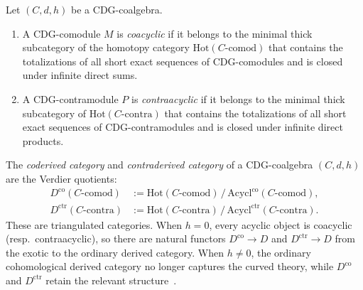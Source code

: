 \begin{definition}
\label{def:coacyclic-contraacyclic}
Let $(C, d, h)$ be a CDG-coalgebra.
\begin{enumerate}[label=\textup{(\roman*)}]
\item A CDG-comodule $M$ is \emph{coacyclic} if it belongs to the
  minimal thick subcategory of the homotopy category
  $\mathrm{Hot}(C\text{-}\mathrm{comod})$ that contains the
  totalizations of all short exact sequences of CDG-comodules
  and is closed under infinite direct sums.
\item A CDG-contramodule $P$ is \emph{contraacyclic} if it belongs
  to the minimal thick subcategory of
  $\mathrm{Hot}(C\text{-}\mathrm{contra})$ that contains the
  totalizations of all short exact sequences of CDG-contramodules
  and is closed under infinite direct products.
\end{enumerate}
\end{definition}

\begin{definition}
\label{def:coderived-contraderived-abstract}
The \emph{coderived category} and \emph{contraderived category}
of a CDG-coalgebra $(C, d, h)$ are the Verdier quotients:
\begin{align}
D^{\mathrm{co}}(C\text{-}\mathrm{comod})
  &:= \mathrm{Hot}(C\text{-}\mathrm{comod})
  \,\big/\, \mathrm{Acycl}^{\mathrm{co}}(C\text{-}\mathrm{comod}),
  \label{eq:coderived-abstract}\\
D^{\mathrm{ctr}}(C\text{-}\mathrm{contra})
  &:= \mathrm{Hot}(C\text{-}\mathrm{contra})
  \,\big/\,
  \mathrm{Acycl}^{\mathrm{ctr}}(C\text{-}\mathrm{contra}).
  \label{eq:contraderived-abstract}
\end{align}
These are triangulated categories.  When $h = 0$, every acyclic
object is coacyclic (resp.\ contraacyclic), so there are natural
functors $D^{\mathrm{co}} \to D$ and $D^{\mathrm{ctr}} \to D$
from the exotic to the ordinary derived category.  When
$h \neq 0$, the ordinary cohomological derived category no longer
captures the curved theory, while $D^{\mathrm{co}}$ and
$D^{\mathrm{ctr}}$ retain the relevant structure~\cite[\S\S3--4]{Positselski11}.
\end{definition}

